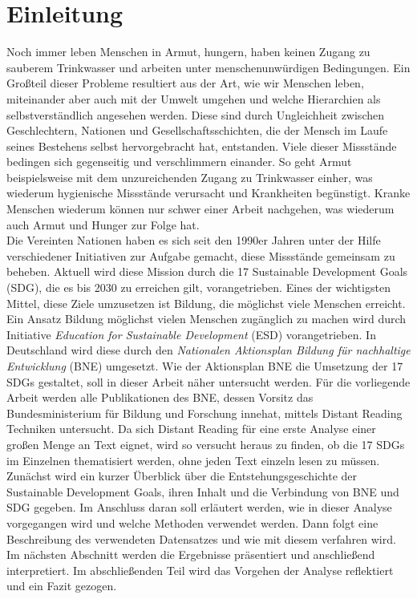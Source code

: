 \documentclass[letterpaper]{article}
\begin{document}
\section{Einleitung}
Noch immer leben Menschen in Armut, hungern, haben keinen Zugang zu sauberem Trinkwasser und arbeiten unter menschenunwürdigen Bedingungen. Ein Großteil dieser Probleme resultiert aus der Art, wie wir Menschen leben, miteinander aber auch mit der Umwelt umgehen und welche Hierarchien als selbstverständlich angesehen werden. Diese sind durch Ungleichheit zwischen Geschlechtern, Nationen und Gesellschaftsschichten, die der Mensch im Laufe seines Bestehens selbst hervorgebracht hat, entstanden. Viele dieser Missstände bedingen sich gegenseitig und verschlimmern einander. So geht Armut beispielsweise mit dem unzureichenden Zugang zu Trinkwasser einher, was wiederum hygienische Missstände verursacht und Krankheiten begünstigt. Kranke Menschen wiederum können nur schwer einer Arbeit nachgehen, was wiederum auch Armut und Hunger zur Folge hat.\\
Die Vereinten Nationen haben es sich seit den 1990er Jahren unter der Hilfe verschiedener Initiativen zur Aufgabe gemacht, diese Missstände gemeinsam zu beheben. Aktuell wird diese Mission durch die 17 Sustainable Development Goals (SDG), die es bis 2030 zu erreichen gilt, vorangetrieben. Eines der wichtigsten Mittel, diese Ziele umzusetzen ist Bildung, die möglichst viele Menschen erreicht. Ein Ansatz Bildung möglichst vielen Menschen zugänglich zu machen wird durch Initiative \textit{Education for Sustainable Development} (ESD) vorangetrieben. In Deutschland wird diese durch den \textit{Nationalen Aktionsplan Bildung für nachhaltige Entwicklung} (BNE) umgesetzt. Wie der Aktionsplan BNE die Umsetzung der 17 SDGs gestaltet, soll in dieser Arbeit näher untersucht werden. Für die vorliegende Arbeit werden alle Publikationen des BNE, dessen Vorsitz das Bundesministerium für Bildung und Forschung innehat, mittels Distant Reading Techniken untersucht. Da sich Distant Reading für eine erste Analyse einer großen Menge an Text eignet, wird so versucht heraus zu finden, ob die 17 SDGs im Einzelnen thematisiert werden, ohne jeden Text einzeln lesen zu müssen.\\
Zunächst wird ein kurzer Überblick über die Entstehungsgeschichte der Sustainable Development Goals, ihren Inhalt und die Verbindung von BNE und SDG gegeben. Im Anschluss daran soll erläutert werden, wie in dieser Analyse vorgegangen wird und welche Methoden verwendet werden. Dann folgt eine Beschreibung des verwendeten Datensatzes und wie mit diesem verfahren wird. Im nächsten Abschnitt werden die Ergebnisse präsentiert und anschließend interpretiert. Im abschließenden Teil wird das Vorgehen der Analyse reflektiert und ein Fazit gezogen. 
\end{document}
